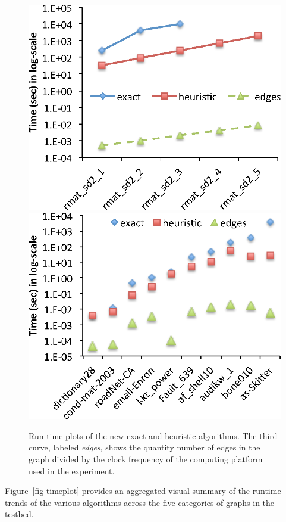 \begin{figure}
    \includegraphics[scale=0.6]{compare_time_sd2.eps}
    \includegraphics[scale=0.6]{compare_time_rw.eps}
    
 \caption{Run time plots of the new exact and heuristic algorithms. The third curve, labeled
 {\em edges}, shows the quantity number of edges in the graph divided by the clock 
 frequency of the computing platform used in the experiment. 
 }
\label{fig-runtimeplots}
\end{figure}


Figure~\ref{fig-timeplot} provides an aggregated visual summary of the runtime trends of
the various algorithms across the five categories of graphs in the testbed. 


